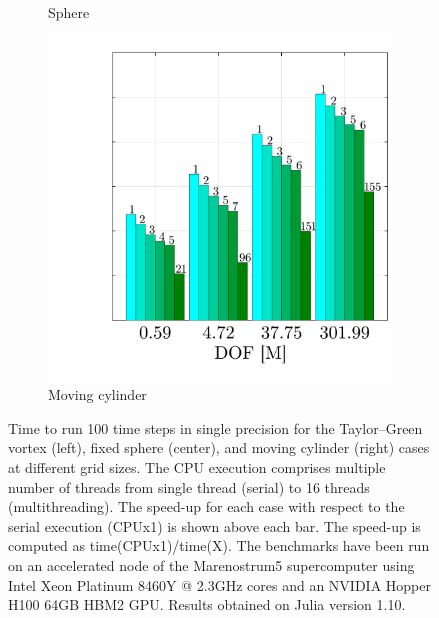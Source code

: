 \documentclass[10pt,a4paper]{article}
\begin{document}
\begin{figure}[!t]
\begin{subfigure}[t]{0.32\linewidth}
    \caption{Sphere\hspace*{-1em}}
  \end{subfigure}
  \begin{subfigure}[t]{0.32\linewidth}
    \centering\hspace*{-0.2cm}
    \includegraphics[width=\linewidth]{img/cylinder_benchmark.pdf}
    \caption{Moving cylinder\hspace*{-1em}}
  \end{subfigure}
	\caption{Time to run 100 time steps in single precision for the Taylor--Green vortex (left), fixed sphere (center), and moving cylinder (right) cases at different grid sizes. The CPU execution comprises multiple number of threads from single thread (serial) to 16 threads (multithreading). The speed-up for each case with respect to the serial execution (CPUx1) is shown above each bar. The speed-up is computed as time(CPUx1)/time(X). The benchmarks have been run on an accelerated node of the Marenostrum5 supercomputer using Intel Xeon Platinum 8460Y @ 2.3GHz cores and an NVIDIA Hopper H100 64GB HBM2 GPU. Results obtained on Julia version 1.10.}
	\label{fig:benchmarks}
\end{figure}
\end{document}

